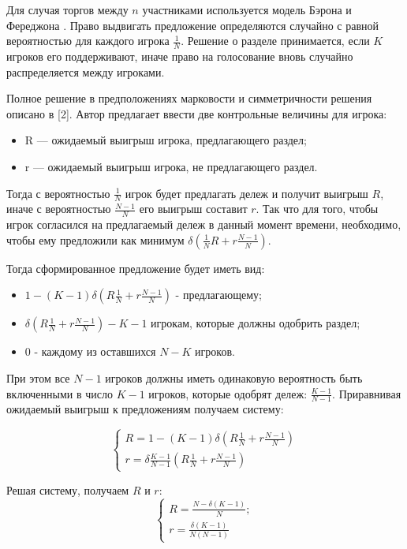 Для случая торгов между $n$ участниками используется модель Бэрона и Фереджона \cite{baron1989bargaining}. Право выдвигать предложение определяются случайно с равной вероятностью для каждого игрока $\frac{1}{N}$. Решение о разделе принимается, если $K$ игроков его поддерживают, иначе право на голосование вновь случайно распределяется между игроками.

Полное решение в предположениях марковости и симметричности решения описано в [2]. Автор предлагает ввести две контрольные величины для игрока: 
\begin{itemize}
    \item R — ожидаемый выигрыш игрока, предлагающего раздел;
    \item r — ожидаемый выигрыш игрока, не предлагающего раздел.
\end{itemize}

Тогда с вероятностью $\frac{1}{N}$ игрок будет предлагать дележ и получит выигрыш $R$, иначе с вероятностью $\frac{N-1}{N}$ его выигрыш составит $r$. Так что для того, чтобы игрок согласился на предлагаемый дележ в данный момент времени, необходимо, чтобы ему предложили как минимум $\delta( \frac{1}{N} R  + r\frac{N-1}{N})$.

Тогда сформированное предложение будет иметь вид:

\begin{itemize}
    \item $1 - (K - 1)\delta( R \frac{1}{N} + r\frac{N-1}{N} )$ - предлагающему;
    \item $\delta( R\frac{1}{N} + r\frac{N-1}{N}) - K-1$ игрокам, которые должны одобрить раздел;
    \item $0$ - каждому из оставшихся $N-K$ игроков.
\end{itemize}


При этом все $N-1$ игроков должны иметь одинаковую вероятность быть включенными в число $K-1$ игроков, которые одобрят дележ: $\frac{K-1}{N-1}$. Приравнивая ожидаемый выигрыш к предложениям получаем систему:

\begin{equation}
    \begin{cases}
        R = 1 - (K - 1) \delta ( R \frac{1}{N} + r\frac{N-1}{N} ) \\
        r= \delta \frac{K-1}{N-1}( R \frac{1}{N} + r\frac{N-1}{N} )
    \end{cases}   
\end{equation}


Решая систему, получаем $R$ и $r$:
\begin{equation}
    \begin{cases}
        R = \frac{N-\delta(K-1)}{N}; \\
        r= \frac{\delta(K-1)}{N(N-1)} 
    \end{cases}   
\end{equation}

